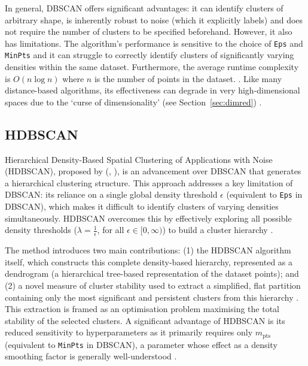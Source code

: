\documentclass[10pt,oneside]{report}
\renewcommand{\citet}[1]{\citeauthor{#1}, \citeyear{#1}}
\begin{document}
In general, DBSCAN offers significant advantages: it can identify clusters of arbitrary shape, is inherently robust to noise (which it explicitly labels) and does not require the number of clusters to be specified beforehand. However, it also has limitations. The algorithm's performance is sensitive to the choice of \texttt{Eps} and \texttt{MinPts} and it can struggle to correctly identify clusters of significantly varying densities within the same dataset. Furthermore, the average runtime complexity is $O(n\log n)$ where $n$ is the number of points in the dataset. \cite{ester1996density, campello2013density}. Like many distance-based algorithms, its effectiveness can degrade in very high-dimensional spaces due to the `curse of dimensionality' (see Section~\ref{sec:dimred}) \cite{hinneburg1999optimal, verleysen2005curse}.



\subsection{HDBSCAN}\label{sec:hdbscan}

Hierarchical Density-Based Spatial Clustering of Applications with Noise (HDBSCAN), proposed by (\citet{campello2013density}), is an advancement over DBSCAN that generates a hierarchical clustering structure. This approach addresses a key limitation of DBSCAN: its reliance on a single global density threshold $\epsilon$ (equivalent to \texttt{Eps} in DBSCAN), which makes it difficult to identify clusters of varying densities simultaneously. HDBSCAN overcomes this by effectively exploring all possible density thresholds ($\lambda = \frac 1 \epsilon$, for all $\epsilon \in \big[0, \infty \big)$) to build a cluster hierarchy \cite{campello2013density}.

The method introduces two main contributions: (1) the HDBSCAN algorithm itself, which constructs this complete density-based hierarchy, represented as a dendrogram (a hierarchical tree-based representation of the dataset points); and (2) a novel measure of cluster stability used to extract a simplified, flat partition containing only the most significant and persistent clusters from this hierarchy \cite{campello2013density}. This extraction is framed as an optimisation problem maximising the total stability of the selected clusters. A significant advantage of HDBSCAN is its reduced sensitivity to hyperparameters as it primarily requires only $m_{\text{pts}}$ (equivalent to \texttt{MinPts} in DBSCAN), a parameter whose effect as a density smoothing factor is generally well-understood \cite{campello2013density}.
\end{document}
